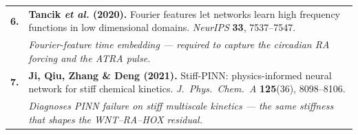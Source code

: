 \documentclass[border=0pt]{standalone}
\newcommand{\refnum}[1]{\textcolor{sablue}{\bfseries #1}}
\newcommand{\reftitle}[1]{\textbf{#1}}
\newcommand{\refwhy}[1]{{\small\itshape\textcolor{sagrey}{#1}}}
\begin{document}
\begin{minipage}{22cm}
\begin{tabular}{@{}p{0.9cm}@{}p{20.6cm}@{}}
\refnum{6.} &
\reftitle{Tancik \emph{et al.} (2020).} Fourier features let networks learn high
frequency functions in low dimensional domains. \emph{NeurIPS} \textbf{33},
7537--7547.\\
& \refwhy{Fourier-feature time embedding --- required to capture the circadian RA forcing and the ATRA pulse.}\\[4pt]

\refnum{7.} &
\reftitle{Ji, Qiu, Zhang \& Deng (2021).} Stiff-PINN: physics-informed neural
network for stiff chemical kinetics. \emph{J.\ Phys.\ Chem.\ A} \textbf{125}(36),
8098--8106.\\
& \refwhy{Diagnoses PINN failure on stiff multiscale kinetics --- the same stiffness that shapes the WNT--RA--HOX residual.}\\

\end{tabular}
\end{minipage}
\end{document}
